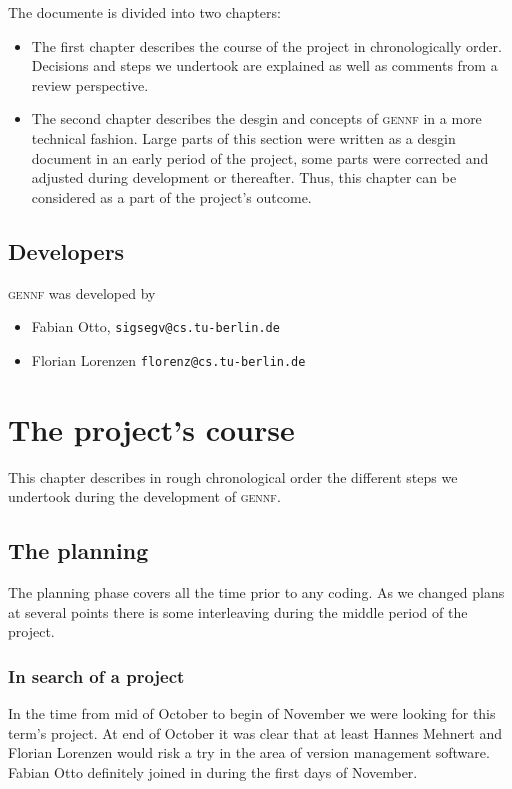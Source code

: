 \documentclass[fleqn, 10pt, a4paper]{report} \usepackage{amssymb}
\newcommand{\GENNF}{\textsc{gennf}}
\begin{document}
The documente is divided into two chapters:
\begin{itemize}
\item The first chapter describes the course of the project in
  chronologically order. Decisions and steps we undertook are
  explained as well as comments from a review perspective.
\item The second chapter describes the desgin and concepts of \GENNF{}
  in a more technical fashion. Large parts of this section were
  written as a desgin document in an early period of the project, some
  parts were corrected and adjusted during development or thereafter.
  Thus, this chapter can be considered as a part of the project's
  outcome.
\end{itemize}

\section*{Developers}

\GENNF{} was developed by
\begin{itemize}
\item Fabian Otto, \texttt{sigsegv@cs.tu-berlin.de}
\item Florian Lorenzen \texttt{florenz@cs.tu-berlin.de}
\end{itemize}


\chapter{The project's course \label{course}}

This chapter describes in rough chronological order the different
steps we undertook during the development of \GENNF{}.

\section{The planning}

The planning phase covers all the time prior to any coding. As we
changed plans at several points there is some interleaving during the
middle period of the project.

\subsection{In search of a project}

In the time from mid of October to begin of November we were looking
for this term's project. At end of October it was clear that at least
Hannes Mehnert and Florian Lorenzen would risk a try in the area of
version management software. Fabian Otto definitely joined in during
the first days of November.
\end{document}
